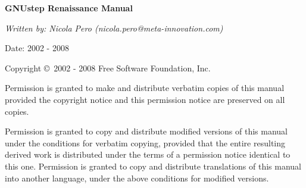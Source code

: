 %
%
%
\begin{titlepage}
\begin{flushleft}
{\phantom{begin page}}
\vskip6cm

{\LARGE\bf GNUstep Renaissance Manual\par}

\vskip1cm

{\sl Written by:  Nicola Pero (nicola.pero@meta-innovation.com)

Date: 2002 - 2008}
\end{flushleft}

\vskip3cm

{\sc Copyright \copyright\ 2002 - 2008 Free Software Foundation, Inc.}

Permission is granted to make and distribute verbatim copies of this
manual provided the copyright notice and this permission notice are
preserved on all copies.

Permission is granted to copy and distribute modified versions of this
manual under the conditions for verbatim copying, provided that the
entire resulting derived work is distributed under the terms of a
permission notice identical to this one.  Permission is granted to
copy and distribute translations of this manual into another language,
under the above conditions for modified versions.

\end{titlepage}





